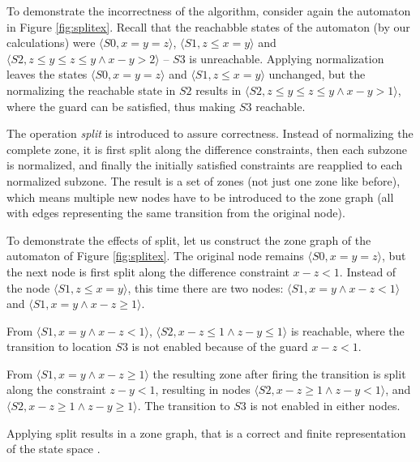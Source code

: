 \begin{example}
	To demonstrate the incorrectness of the algorithm, consider again the automaton in Figure \ref{fig:splitex}. Recall that the reachabble states of the automaton (by our calculations) were $\langle S0,x=y=z \rangle$, $\langle S1,z \leq x=y \rangle$ and $\langle S2,z \leq y \leq z \leq y \wedge x-y > 2\rangle$ -- $S3$ is unreachable. Applying normalization leaves the states $\langle S0,x=y=z \rangle$ and $\langle S1,z \leq x=y \rangle$ unchanged, but the normalizing the reachable state in $S2$ results in $\langle S2,z \leq y \leq z \leq y \wedge x-y > 1\rangle$, where the guard can be satisfied, thus making $S3$ reachable.
\end{example}

The operation \emph{split} \cite{bengtsson2004timed} is introduced to assure correctness. Instead of
normalizing the complete zone, it is first split along the difference constraints,
then each subzone is normalized, and finally the initially satisfied constraints are reapplied to each normalized subzone. The result is a set of zones (not just one zone like before), which means multiple new nodes have to be introduced to the zone graph (all with edges representing the same transition from the original node).

\begin{example}
To demonstrate the effects of split, let us construct the zone graph of the automaton of Figure \ref{fig:splitex}. The original node remains  $\langle S0,x=y=z \rangle$, but the next node is first split along the difference constraint $x-z<1$. Instead of the node $\langle S1,z \leq x=y \rangle$, this time there are two nodes: $\langle S1, x=y \wedge x-z<1 \rangle$ and $\langle S1, x=y \wedge x-z \geq 1 \rangle$.

From  $\langle S1, x=y \wedge x-z<1 \rangle$,  $\langle S2,x-z \leq 1 \wedge z-y \leq 1\rangle$ is reachable, where the transition to location $S3$ is not enabled because of the guard $x-z < 1$.

From $\langle S1, x=y \wedge x-z \geq 1 \rangle$ the resulting zone after firing the transition is split along the constraint $z-y<1$, resulting in nodes $\langle S2, x-z \geq 1 \wedge z-y < 1\rangle$, and $\langle S2, x-z \geq 1 \wedge z-y \geq 1\rangle$. The transition to $S3$ is not enabled in either nodes. 
\end{example}

Applying split results in a zone graph, that is a correct and finite representation of the state space \cite{bengtsson2004timed}.

